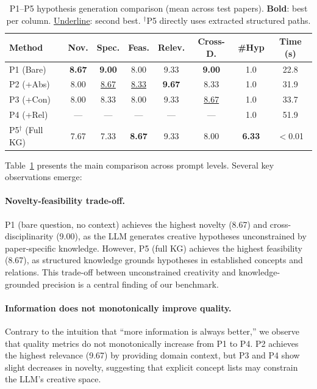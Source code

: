 \documentclass{article}
\begin{document}
\begin{table}[t]
\centering
\caption{P1--P5 hypothesis generation comparison (mean across test papers). \textbf{Bold}: best per column. \underline{Underline}: second best. $^\dagger$P5 directly uses extracted structured paths.}
\label{tab:p1p5}
\small
\begin{tabular}{lccccccc}
\toprule
\textbf{Method} & \textbf{Nov.} & \textbf{Spec.} & \textbf{Feas.} & \textbf{Relev.} & \textbf{Cross-D.} & \textbf{\#Hyp} & \textbf{Time (s)} \\
\midrule
P1 (Bare) & \textbf{8.67} & \textbf{9.00} & 8.00 & 9.33 & \textbf{9.00} & 1.0 & 22.8 \\
P2 (+Abs) & 8.00 & \underline{8.67} & \underline{8.33} & \textbf{9.67} & 8.33 & 1.0 & 31.9 \\
P3 (+Con) & 8.00 & 8.33 & 8.00 & 9.33 & \underline{8.67} & 1.0 & 33.7 \\
P4 (+Rel) & --- & --- & --- & --- & --- & 1.0 & 51.9 \\
P5$^\dagger$ (Full KG) & 7.67 & 7.33 & \textbf{8.67} & 9.33 & 8.00 & \textbf{6.33} & $<$0.01 \\
\bottomrule
\end{tabular}
\end{table}

Table~\ref{tab:p1p5} presents the main comparison across prompt levels.
Several key observations emerge:

\paragraph{Novelty-feasibility trade-off.}
P1 (bare question, no context) achieves the highest novelty (8.67) and cross-disciplinarity (9.00), as the LLM generates creative hypotheses unconstrained by paper-specific knowledge.
However, P5 (full KG) achieves the highest feasibility (8.67), as structured knowledge grounds hypotheses in established concepts and relations.
This trade-off between unconstrained creativity and knowledge-grounded precision is a central finding of our benchmark.

\paragraph{Information does not monotonically improve quality.}
Contrary to the intuition that ``more information is always better,'' we observe that quality metrics do not monotonically increase from P1 to P4.
P2 achieves the highest relevance (9.67) by providing domain context, but P3 and P4 show slight decreases in novelty, suggesting that explicit concept lists may constrain the LLM's creative space.
\end{document}
